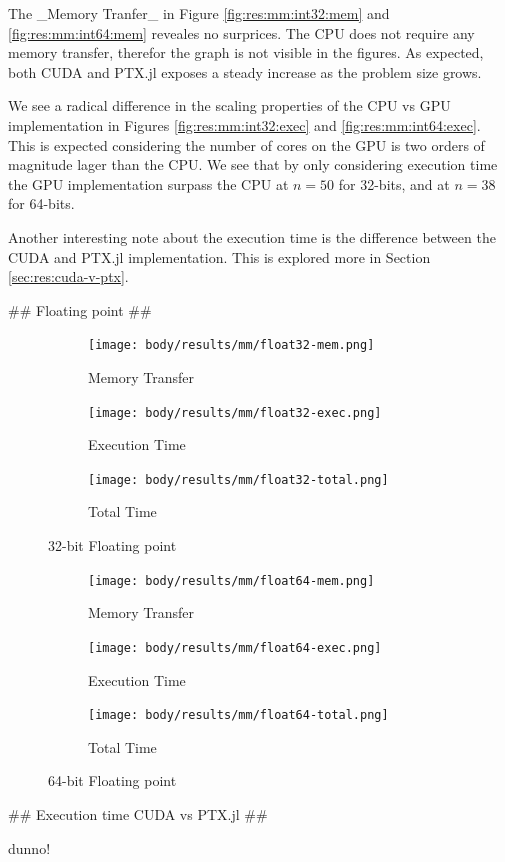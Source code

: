 \begin{markdown}
The _Memory Tranfer_ in Figure \ref{fig:res:mm:int32:mem} and
\ref{fig:res:mm:int64:mem} reveales no surprices. The CPU does not
require any memory transfer, therefor the graph is not visible in the
figures. As expected, both CUDA and PTX.jl exposes a steady increase
as the problem size grows.

We see a radical difference in the scaling properties of the CPU vs
GPU implementation in Figures \ref{fig:res:mm:int32:exec} and
\ref{fig:res:mm:int64:exec}. This is expected considering the number
of cores on the GPU is two orders of magnitude lager than the CPU. We
see that by only considering execution time the GPU implementation
surpass the CPU at $n=50$ for 32-bits, and at $n=38$ for 64-bits.

Another interesting note about the execution time is the difference
between the CUDA and PTX.jl implementation. This is explored more in
Section \ref{sec:res:cuda-v-ptx}.


## Floating point ##

\begin{figure}[H]
  \centering
  \begin{subfigure}{.33\textwidth}
    \centering
    \texttt{[image: body/results/mm/float32-mem.png]}
    \caption{Memory Transfer}
    \label{fig:res:mm:float32:mem}
  \end{subfigure}%
  \begin{subfigure}{.33\textwidth}
    \centering
    \texttt{[image: body/results/mm/float32-exec.png]}
    \caption{Execution Time}
    \label{fig:res:mm:float32:exec}
  \end{subfigure}%
  \begin{subfigure}{.33\textwidth}
    \centering
    \texttt{[image: body/results/mm/float32-total.png]}
    \caption{Total Time}
    \label{fig:res:mm:float32:tot}
  \end{subfigure}
  \caption{32-bit Floating point}
  \label{fig:res:mm:float32}
\end{figure}


\begin{figure}[H]
  \centering
  \begin{subfigure}{.33\textwidth}
    \centering
    \texttt{[image: body/results/mm/float64-mem.png]}
    \caption{Memory Transfer}
    \label{fig:res:mm:float64:mem}
  \end{subfigure}%
  \begin{subfigure}{.33\textwidth}
    \centering
    \texttt{[image: body/results/mm/float64-exec.png]}
    \caption{Execution Time}
    \label{fig:res:mm:float64:exec}
  \end{subfigure}%
  \begin{subfigure}{.33\textwidth}
    \centering
    \texttt{[image: body/results/mm/float64-total.png]}
    \caption{Total Time}
    \label{fig:res:mm:float64:tot}
  \end{subfigure}
  \caption{64-bit Floating point}
  \label{fig:res:mm:float64}
\end{figure}

## Execution time CUDA vs PTX.jl ##

dunno!

\end{markdown}
